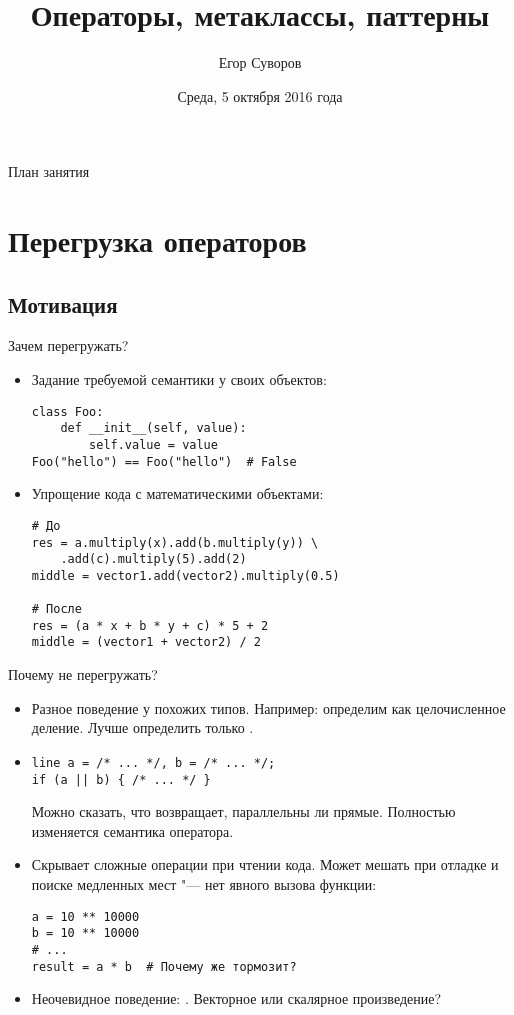 \documentclass[utf8,xcolor=table]{beamer}
\title{Операторы, метаклассы, паттерны}
\author{Егор Суворов}
\institute[СПб АУ]{Курс <<Парадигмы и языки программирования>>, подгруппа 3}
\date[05.10.2016]{Среда, 5 октября 2016 года}
\renewcommand{\t}[1]{\ifmmode{\mathtt{#1}}\else{\texttt{#1}}\fi}
\begin{document}
\begin{frame}
\titlepage
\end{frame}

\begin{frame}{План занятия}
	\tableofcontents
\end{frame}

\section{Перегрузка операторов}
\subsection{Мотивация}

\begin{frame}
	\tableofcontents[currentsection]
\end{frame}

\begin{frame}[fragile]{Зачем перегружать?}
	\begin{itemize}
		\item Задание требуемой семантики у своих объектов:	
\begin{verbatim}
class Foo:
    def __init__(self, value):
        self.value = value
Foo("hello") == Foo("hello")  # False
\end{verbatim}

		\item Упрощение кода с математическими объектами:
\begin{verbatim}
# До
res = a.multiply(x).add(b.multiply(y)) \
    .add(c).multiply(5).add(2)
middle = vector1.add(vector2).multiply(0.5)
	
# После
res = (a * x + b * y + c) * 5 + 2
middle = (vector1 + vector2) / 2
\end{verbatim}
	\end{itemize}
\end{frame}

\begin{frame}[fragile]{Почему не перегружать?}
	\pause
	\begin{itemize}
		\item
			Разное поведение у похожих типов.
			Например: определим \t{/} как целочисленное деление.
			Лучше определить только \t{//}.
			\pause
		\item
\begin{verbatim}
line a = /* ... */, b = /* ... */;
if (a || b) { /* ... */ }
\end{verbatim}
			\pause
			Можно сказать, что \t{||} возвращает, параллельны ли прямые.
			Полностью изменяется семантика оператора.
			\pause
		\item
			Скрывает сложные операции при чтении кода.
			Может мешать при отладке и поиске медленных мест "--- нет явного вызова функции:
\begin{verbatim}
a = 10 ** 10000
b = 10 ** 10000
# ...
result = a * b  # Почему же тормозит?
\end{verbatim}
		\item
			Неочевидное поведение: \t{vec1 * vec2}.
			\pause
			Векторное или скалярное произведение?
	\end{itemize}
\end{frame}
\end{document}
